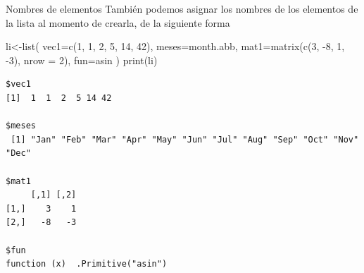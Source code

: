 \documentclass[
  ignorenonframetext,
  aspectratio=169,
  spanish,
]{beamer}
\newenvironment{Shaded}{\begin{snugshade}}{\end{snugshade}}
\newcommand{\AttributeTok}[1]{\textcolor[rgb]{0.40,0.45,0.13}{#1}}
\newcommand{\DecValTok}[1]{\textcolor[rgb]{0.68,0.00,0.00}{#1}}
\newcommand{\FunctionTok}[1]{\textcolor[rgb]{0.28,0.35,0.67}{#1}}
\newcommand{\NormalTok}[1]{\textcolor[rgb]{0.00,0.23,0.31}{#1}}
\newcommand{\OtherTok}[1]{\textcolor[rgb]{0.00,0.23,0.31}{#1}}
\newcommand{\SpecialCharTok}[1]{\textcolor[rgb]{0.37,0.37,0.37}{#1}}
\begin{document}
\begin{frame}[fragile]{Nombres de elementos}
\label{nombres-de-elementos-1}
También podemos asignar los nombres de los elementos de la lista al
momento de crearla, de la siguiente forma

\begin{Shaded}
\begin{Highlighting}[]
\NormalTok{li}\OtherTok{\textless{}{-}}\FunctionTok{list}\NormalTok{(}
\AttributeTok{vec1=}\FunctionTok{c}\NormalTok{(}\DecValTok{1}\NormalTok{, }\DecValTok{1}\NormalTok{, }\DecValTok{2}\NormalTok{, }\DecValTok{5}\NormalTok{, }\DecValTok{14}\NormalTok{, }\DecValTok{42}\NormalTok{),}
\AttributeTok{meses=}\NormalTok{month.abb,}
\AttributeTok{mat1=}\FunctionTok{matrix}\NormalTok{(}\FunctionTok{c}\NormalTok{(}\DecValTok{3}\NormalTok{, }\SpecialCharTok{{-}}\DecValTok{8}\NormalTok{, }\DecValTok{1}\NormalTok{, }\SpecialCharTok{{-}}\DecValTok{3}\NormalTok{), }\AttributeTok{nrow =} \DecValTok{2}\NormalTok{),}
\AttributeTok{fun=}\NormalTok{asin}
\NormalTok{) }
\FunctionTok{print}\NormalTok{(li)  }
\end{Highlighting}
\end{Shaded}

\begin{verbatim}
$vec1
[1]  1  1  2  5 14 42

$meses
 [1] "Jan" "Feb" "Mar" "Apr" "May" "Jun" "Jul" "Aug" "Sep" "Oct" "Nov" "Dec"

$mat1
     [,1] [,2]
[1,]    3    1
[2,]   -8   -3

$fun
function (x)  .Primitive("asin")
\end{verbatim}
\end{frame}
\end{document}
